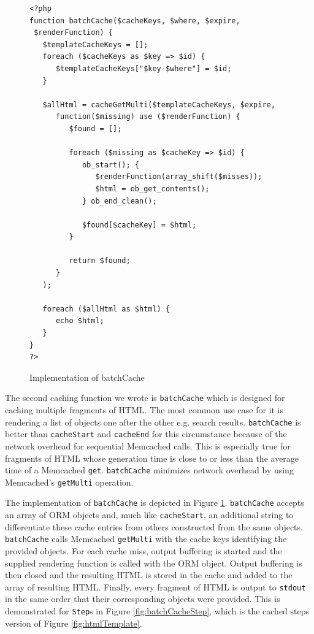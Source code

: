 \documentclass[12pt]{ucthesis}
\begin{document}
\begin{figure}[hbtp]
\begin{ssp}
\begin{verbatim}
<?php
function batchCache($cacheKeys, $where, $expire,
 $renderFunction) {
   $templateCacheKeys = [];
   foreach ($cacheKeys as $key => $id) {
      $templateCacheKeys["$key-$where"] = $id;
   }

   $allHtml = cacheGetMulti($templateCacheKeys, $expire,
      function($missing) use ($renderFunction) {
         $found = [];

         foreach ($missing as $cacheKey => $id) {
            ob_start(); {
               $renderFunction(array_shift($misses));
               $html = ob_get_contents();
            } ob_end_clean();

            $found[$cacheKey] = $html;
         }

         return $found;
      }
   );

   foreach ($allHtml as $html) {
      echo $html;
   }
}
?>
\end{verbatim}
\end{ssp}
\caption{Implementation of batchCache}
\label{fig:batchCacheImplementation}
\end{figure}

The second caching function we wrote is {\tt batchCache} which is designed for caching multiple fragments of HTML.
The most common use case for it is rendering a list of objects one after the other e.g. search results.
{\tt batchCache} is better than {\tt cacheStart} and {\tt cacheEnd} for this circumstance because of the network overhead for sequential \textsf{Memcached} calls.
This is especially true for fragments of HTML whose generation time is close to or less than the average time of a \textsf{Memcached} {\tt get}.
{\tt batchCache} minimizes network overhead by using \textsf{Memcached}'s {\tt getMulti} operation.

The implementation of {\tt batchCache} is depicted in Figure \ref{fig:batchCacheImplementation}.
{\tt batchCache} accepts an array of ORM objects and, much like {\tt cacheStart}, an additional string to differentiate these cache entries from others constructed from the same objects.
{\tt batchCache} calls \textsf{Memcached} {\tt getMulti} with the cache keys identifying the provided objects.
For each cache miss, output buffering is started and the supplied rendering function is called with the ORM object.
Output buffering is then closed and the resulting HTML is stored in the cache and added to the array of resulting HTML.
Finally, every fragment of HTML is output to {\tt stdout} in the same order that their corresponding objects were provided.
This is demonstrated for {\tt Step}s in Figure \ref{fig:batchCacheStep}, which is the cached steps version of Figure \ref{fig:htmlTemplate}.
\end{document}
